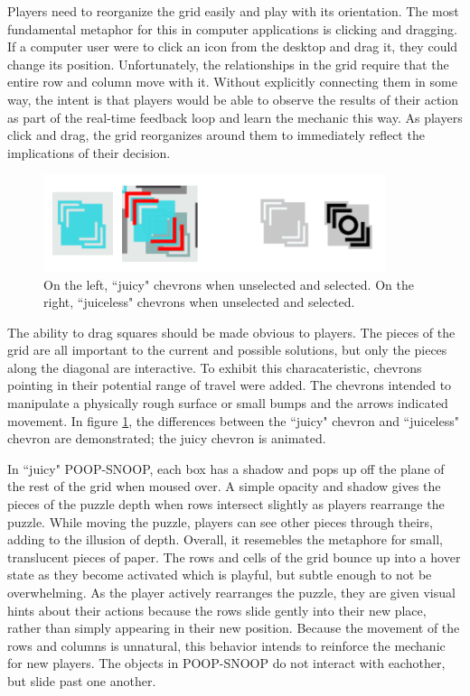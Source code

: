 Players need to reorganize the grid easily and play with its orientation. The most fundamental metaphor for this in computer applications is clicking and dragging. If a computer user were to click an icon from the desktop and drag it, they could change its position. Unfortunately, the relationships in the grid require that the entire row and column move with it. Without explicitly connecting them in some way, the intent is that players would be able to observe the results of their action as part of the real-time feedback loop and learn the mechanic this way. As players click and drag, the grid reorganizes around them to immediately reflect the implications of their decision.

\begin{figure}
\begin{center}
\includegraphics[width=100mm]{images/chevron.pdf}
\caption[Differences between chevrons in each prototype]{On the left, ``juicy" chevrons when unselected and selected. On the right, ``juiceless" chevrons when unselected and selected.}
\label{fig:chevrons}
\end{center}
\end{figure}

The ability to drag squares should be made obvious to players. The pieces of the grid are all important to the current and possible solutions, but only the pieces along the diagonal are interactive. To exhibit this characateristic, chevrons pointing in their potential range of travel were added. The chevrons intended to manipulate a physically rough surface or small bumps and the arrows indicated movement. In figure \ref{fig:chevrons}, the differences between the ``juicy" chevron and ``juiceless" chevron are demonstrated; the juicy chevron is animated.

In ``juicy" POOP-SNOOP, each box has a shadow and pops up off the plane of the rest of the grid when moused over. A simple opacity and shadow gives the pieces of the puzzle depth when rows intersect slightly as players rearrange the puzzle. While moving the puzzle, players can see other pieces through theirs, adding to the illusion of depth. Overall, it resemebles the metaphore for small, translucent pieces of paper. The rows and cells of the grid bounce up into a hover state as they become activated which is playful, but subtle enough to not be overwhelming. As the player actively rearranges the puzzle, they are given visual hints about their actions because the rows slide gently into their new place, rather than simply appearing in their new position. Because the movement of the rows and columns is unnatural, this behavior intends to reinforce the mechanic for new players. The objects in POOP-SNOOP do not interact with eachother, but slide past one another.

